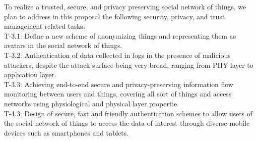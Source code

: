 To realize a trusted, secure, and privacy preserving social network of things, we plan to address in this proposal the following security, privacy, and trust management related tasks:\\

T-3.1: Define a new scheme of anonymizing things and representing them as avatars in the social network of things.\\

T-3.2: Authentication of data collected in fogs in the presence of malicious attackers, despite the attack surface being very broad, ranging from PHY layer to application layer.\\

T-3.3: Achieving end-to-end secure and privacy-preserving information flow monitoring between users and things, covering all sort of things and access networks using physiological and physical layer propertie.\\

T-4.3: Design of secure, fast and friendly authentication schemes to allow users of the social network of things to access the data of interest through diverse mobile devices such as smartphones and tablets.\\